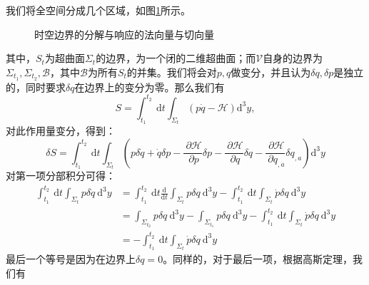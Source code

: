 \documentclass[hyperref, UTF8, a4paper]{ctexart}
\begin{document}
我们将全空间分成几个区域，如图\ref{foilation of the boundary}所示。

\begin{figure}
	\centering
	
	\caption{时空边界的分解与响应的法向量与切向量}
	\label{foilation of the boundary}
\end{figure}

其中，$S_{t}$为超曲面$\Sigma _{t}$的边界，为一个闭的二维超曲面；而$\mathscr{V}$自身的边界为$\Sigma _{t_{1}} ,\Sigma _{t_{2}} ,\mathscr{B}$，其中$\mathscr{B}$为所有$S_{t}$的并集。我们将会对$p,q$做变分，并且认为$\delta q,\delta p$是独立的，同时要求$\delta q$在边界上的变分为零。那么我们有
\begin{equation*}
	S=\int _{t_{1}}^{t_{2}} \ \mathrm{d} t\int _{\Sigma _{t}} (p\dot{q} -\mathcal{H} )\mathrm{d}^{3} y,
\end{equation*}
对此作用量变分，得到：
\begin{equation*}
	\delta S=\int _{t_{1}}^{t_{2}} \ \mathrm{d} t\int _{\Sigma _{t}}\left( p\delta \dot{q} +\dot{q} \delta p-\frac{\mathcal{\ \partial H}}{\ \partial p} \delta p-\frac{\mathcal{\ \partial H}}{\ \partial q} \delta q-\frac{\mathcal{\ \partial H}}{\ \partial q_{,a}} \delta q_{,a}\right)\mathrm{d}^{3} y
\end{equation*}
对第一项分部积分可得：
\begin{equation*}
	\begin{aligned}
		\int _{t_{1}}^{t_{2}}\mathrm{\ d} t\int _{\Sigma _{t}} p\delta \dot{q}\mathrm{\ d}^{3} y & =\int _{t_{1}}^{t_{2}}\mathrm{\ d} t\frac{\mathrm{d}}{\mathrm{d} t}\int _{\Sigma _{t}} p\delta q\mathrm{\ d}^{3} y-\int _{t_{1}}^{t_{2}}\mathrm{\ d} t\int _{\Sigma _{t}}\dot{p} \delta q\mathrm{\ d}^{3} y\\
		& =\int _{\Sigma _{t_{2}}} p\delta q\mathrm{\ d}^{3} y-\int _{\Sigma _{t_{1}}} p\delta q\mathrm{\ d}^{3} y-\int _{t_{1}}^{t_{2}}\mathrm{\ d} t\int _{\Sigma _{t}}\dot{p} \delta q\mathrm{\ d}^{3} y\\
		& =-\int _{t_{1}}^{t_{2}}\mathrm{\ d} t\int _{\Sigma _{t}}\dot{p} \delta q\mathrm{\ d}^{3} y
	\end{aligned}
\end{equation*}
最后一个等号是因为在边界上$\delta q=0$。同样的，对于最后一项，根据高斯定理，我们有
\end{document}
